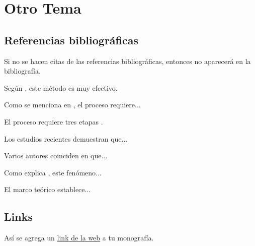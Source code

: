 \section{Otro Tema}
\subsection{Referencias bibliográficas}
Si no se hacen citas de las referencias bibliográficas, entonces no aparecerá en la bibliografía.

Según \cite{referencia_libro}, este método es muy efectivo.

Como se menciona en \cite[p.~45]{referencia_libro}, el proceso requiere...

El proceso requiere tres etapas \cite[ver página~72]{referencia_libro}.

Los estudios recientes \cite[pp.~56-59]{referencia_articulo} demuestran que...

Varios autores \cite[Páginas~101-105]{referencia_libro} coinciden en que...

Como explica \cite[Capítulo~3]{referencia_libro}, este fenómeno...

El marco teórico \cite[Cap.~\RN{3}]{referencia_libro} establece...

\subsection{Links}
Así se agrega un \href{www.google.com}{link de la web} a tu monografía.
\pagebreak
